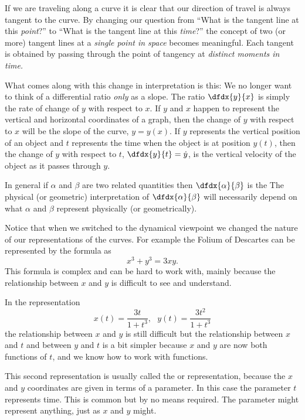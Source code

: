 If we are traveling along a curve it is clear that our direction of
travel is always tangent to the curve. By changing our question from
``What is the tangent line at this \emph{point}?'' to ``What is the
tangent line at this \emph{time}?'' the concept of two (or more)
tangent lines at a \emph{single point in space} becomes
meaningful. Each tangent is obtained by passing through the point of
tangency at \emph{distinct moments in time.}

What comes along with this change in interpretation is this: We no
longer want to think of a differential ratio \emph{only} as a
slope. The ratio $\dfdx{y}{x}$ is simply the rate of change of $y$
with respect to $x$. If $y$ and $x$ happen to represent the vertical
and horizontal coordinates of a graph, then the change of $y$ with
respect to $x$ will be the slope of the curve, $y=y(x)$. If $y$
represents the vertical position of an object and $t$ represents the
time when the object is at position $y(t)$, then the change of $y$ with
respect to $t$, $\dfdx{y}{t}=\dot{y}$, is the vertical velocity of the object
as it passes through $y$.

In general if $\alpha$ and $\beta$ are two related quantities  then
$\dfdx{\alpha}{\beta}$ is the  The physical (or geometric) interpretation of
$\dfdx{\alpha}{\beta}$ will necessarily depend on what $\alpha$ and
$\beta$ represent physically (or geometrically).

Notice that when we switched to the dynamical viewpoint we changed the
nature of our representations of the curves. For example the Folium of
Descartes can be represented by the formula as
$$x^3+y^3=3xy.$$
This formula is complex and can be hard to work with, mainly because
the relationship between $x$ and $y$ is difficult to see and understand.

In the representation
$$
  x(t)=\frac{3t}{1+t^3}, \ \  \  
  y(t)=\frac{3t^2}{1+t^3}
  $$
  the relationship between $x$ and $y$ is still difficult but the
relationship between $x$ and $t$ and between $y$ and $t$ is a bit
simpler because $x$ and $y$ are now both functions of $t$, and we know
how to work with functions.
    
This second representation is usually called the \term{parametric
  functions} or \term{parametric equation} representation, because the
$x$ and $y$ coordinates are given in terms of a parameter. In this
case the parameter $t$ represents time. This is common but by no means
required. The parameter might represent anything, just as $x$ and $y$
might.

